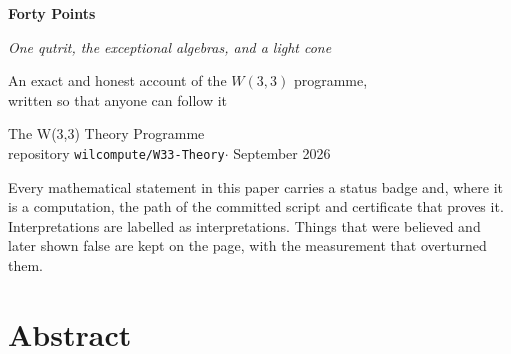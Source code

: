 \documentclass[11pt,twoside]{article}
\theoremstyle{plain}
\theoremstyle{definition}
\theoremstyle{remark}
\begin{document}
\pagecolor{paper}

\begin{titlepage}
\thispagestyle{empty}
\centering
\vspace*{8mm}

\vspace{12mm}
{\sffamily\fontsize{30}{36}\selectfont\bfseries\color{ink} Forty Points\par}
\vspace{4mm}
{\Large\itshape\color{teal} One qutrit, the exceptional algebras, and a light cone\par}
\vspace{9mm}
{\large An exact and honest account of the $W(3,3)$ programme,\\
written so that anyone can follow it\par}
\vspace{12mm}
{\sffamily\color{slate} The W(3,3) Theory Programme\\[2pt]
\small repository \texttt{wilcompute/W33-Theory}\quad$\cdot$ September 2026\par}
\vfill
\begin{minipage}{0.86\textwidth}\small\color{slate}
Every mathematical statement in this paper carries a status badge and, where it is
a computation, the path of the committed script and certificate that proves it.
Interpretations are labelled as interpretations. Things that were believed and later
shown false are kept on the page, with the measurement that overturned them.
\end{minipage}
\vspace{6mm}
\end{titlepage}

\thispagestyle{empty}
\section*{Abstract}
\end{document}
